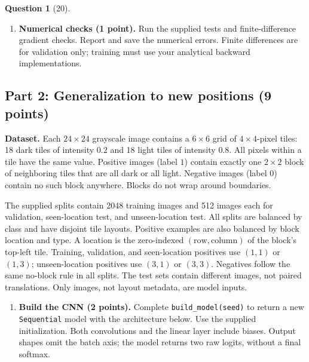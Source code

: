 \documentclass[12pt]{article}
\theoremstyle{definition}
\newtheorem{exercise}{Question}%
\begin{document}
\begin{exercise}[20]
{\begin{enumerate}[label=\textbf{2.1.\arabic*}, leftmargin=*]
    \item \textbf{Numerical checks (1 point).}
    Run the supplied tests and finite-difference gradient checks.
    Report and save the numerical errors. Finite differences are
    for validation only; training must use your analytical backward
    implementations.
\end{enumerate}

\subsection*{Part 2: Generalization to new positions (9 points)}

\textbf{Dataset.}
Each $24\times24$ grayscale image contains a $6\times6$ grid of
$4\times4$-pixel tiles: 18 dark tiles of intensity $0.2$ and 18 light
tiles of intensity $0.8$. All pixels within a tile have the same value.
Positive images (label $1$) contain exactly one $2\times2$ block of
neighboring tiles that are all dark or all light. Negative images
(label $0$) contain no such block anywhere. Blocks do not wrap
around boundaries.

The supplied splits contain 2048 training images and 512 images each
for validation, seen-location test, and unseen-location test.
All splits are balanced by class and have disjoint tile layouts.
Positive examples are also balanced by block location and type.
A location is the zero-indexed $(\mathrm{row},\mathrm{column})$ of
the block's top-left tile. Training, validation, and seen-location
positives use $(1,1)$ or $(1,3)$; unseen-location positives use
$(3,1)$ or $(3,3)$. Negatives follow the same no-block rule in all
splits. The test sets contain different images, not paired translations.
Only images, not layout metadata, are model inputs.

\begin{enumerate}[label=\textbf{2.2.\arabic*}, leftmargin=*]
    \item \textbf{Build the CNN (2 points).}
    Complete \texttt{build\_model(seed)} to return a new
    \texttt{Sequential} model with the architecture below.
    Use the supplied initialization. Both convolutions and the
    linear layer include biases. Output shapes omit the batch axis;
    the model returns two raw logits, without a final softmax.


\end{enumerate}}
\end{exercise}
\end{document}
